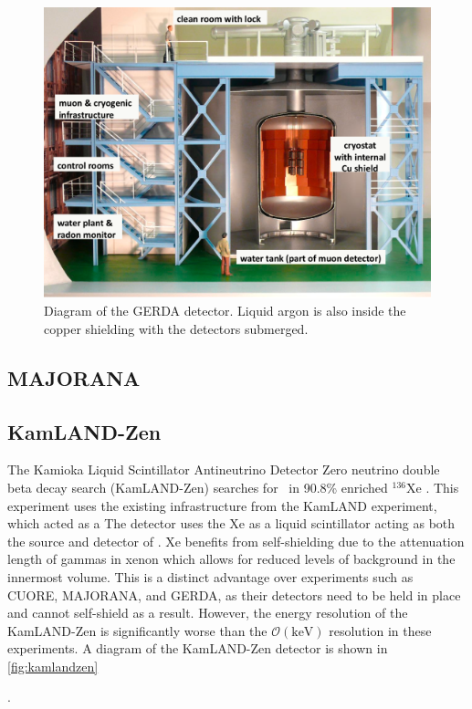 {\begin{figure}[tbph]
\centering
\includegraphics[width=0.7\linewidth]{Figures/gerda-view.png}
\caption{Diagram of the GERDA detector. Liquid argon is also inside the copper shielding with the detectors submerged.}
\label{fig:gerda-labelled}
\end{figure}

\subsection{MAJORANA}

\subsection{KamLAND-Zen}
The Kamioka Liquid Scintillator Antineutrino Detector Zero neutrino double beta decay search (KamLAND-Zen) searches for \zeronubb~in 90.8\% enriched $^{136}$Xe \cite{KamLAND-Zen:2016pfg}. This experiment uses the existing infrastructure from the KamLAND experiment, which acted as a  The detector uses the Xe as a liquid scintillator acting as both the source and detector of \zeronubb. Xe benefits from self-shielding due to the attenuation length of gammas in xenon which allows for reduced levels of background in the innermost volume. This is a distinct advantage over experiments such as CUORE, MAJORANA, and GERDA, as their detectors need to be held in place and cannot self-shield as a result. However, the energy resolution of the KamLAND-Zen is significantly worse than the $\mathcal{O}(\textrm{keV})$ resolution in these experiments. A diagram of the KamLAND-Zen detector is shown in \autoref{fig:kamlandzen}}.

